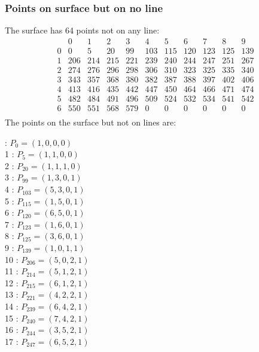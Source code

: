 \documentclass{article}
\begin{document}
{\subsubsection*{Points on surface but on no line}
The surface has 64 points not on any line:\\
$$
\begin{array}{r|*{10}{r}}
 & 0 & 1 & 2 & 3 & 4 & 5 & 6 & 7 & 8 & 9\\
\hline
0 & 0 & 5 & 20 & 99 & 103 & 115 & 120 & 123 & 125 & 139\\
1 & 206 & 214 & 215 & 221 & 239 & 240 & 244 & 247 & 251 & 267\\
2 & 274 & 276 & 296 & 298 & 306 & 310 & 323 & 325 & 335 & 340\\
3 & 343 & 357 & 368 & 380 & 382 & 387 & 388 & 397 & 402 & 406\\
4 & 413 & 416 & 435 & 442 & 447 & 450 & 464 & 466 & 471 & 474\\
5 & 482 & 484 & 491 & 496 & 509 & 524 & 532 & 534 & 541 & 542\\
6 & 550 & 551 & 568 & 579 & 0 & 0 & 0 & 0 & 0 & 0\\
\end{array}
$$
The points on the surface but not on lines are:\\
\begin{multicols}{2}
 : $P_{0}=( 1, 0, 0, 0 )$\\
1 : $P_{5}=( 1, 1, 0, 0 )$\\
2 : $P_{20}=( 1, 1, 1, 0 )$\\
3 : $P_{99}=( 1, 3, 0, 1 )$\\
4 : $P_{103}=( 5, 3, 0, 1 )$\\
5 : $P_{115}=( 1, 5, 0, 1 )$\\
6 : $P_{120}=( 6, 5, 0, 1 )$\\
7 : $P_{123}=( 1, 6, 0, 1 )$\\
8 : $P_{125}=( 3, 6, 0, 1 )$\\
9 : $P_{139}=( 1, 0, 1, 1 )$\\
10 : $P_{206}=( 5, 0, 2, 1 )$\\
11 : $P_{214}=( 5, 1, 2, 1 )$\\
12 : $P_{215}=( 6, 1, 2, 1 )$\\
13 : $P_{221}=( 4, 2, 2, 1 )$\\
14 : $P_{239}=( 6, 4, 2, 1 )$\\
15 : $P_{240}=( 7, 4, 2, 1 )$\\
16 : $P_{244}=( 3, 5, 2, 1 )$\\
17 : $P_{247}=( 6, 5, 2, 1 )$\\

\end{multicols}}
\end{document}

